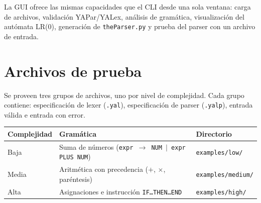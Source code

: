 \documentclass[11pt,a4paper]{article}
\begin{document}
La GUI ofrece las mismas capacidades que el CLI desde una sola ventana:
carga de archivos, validación YAPar/YALex, análisis de gramática,
visualización del autómata LR(0), generación de \texttt{theParser.py} y
prueba del parser con un archivo de entrada.

\section{Archivos de prueba}

Se proveen tres grupos de archivos, uno por nivel de complejidad.
Cada grupo contiene: especificación de lexer (\texttt{.yal}),
especificación de parser (\texttt{.yalp}), entrada válida e
entrada con error.

\begin{center}
\begin{tabular}{lll}
  \toprule
  \textbf{Complejidad} & \textbf{Gramática} & \textbf{Directorio} \\
  \midrule
  Baja   & Suma de números
          (\texttt{expr $\to$ NUM $\mid$ expr PLUS NUM})
        & \texttt{examples/low/} \\
  Media  & Aritmética con precedencia ($+$, $\times$, paréntesis)
        & \texttt{examples/medium/} \\
  Alta   & Asignaciones e instrucción \texttt{IF\ldots THEN\ldots END}
        & \texttt{examples/high/} \\
  \bottomrule
\end{tabular}
\end{center}
\end{document}
